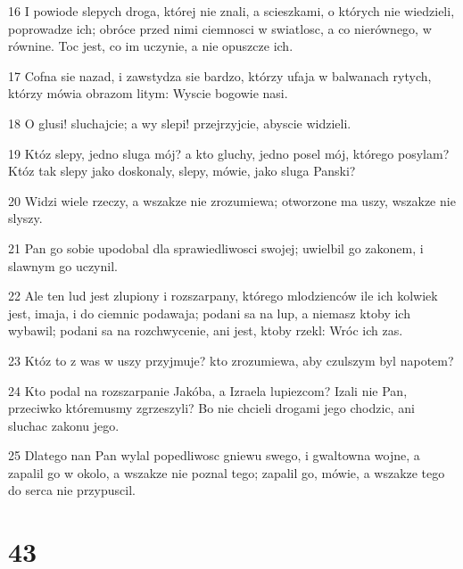 \par 16 I powiode slepych droga, której nie znali, a scieszkami, o których nie wiedzieli, poprowadze ich; obróce przed nimi ciemnosci w swiatlosc, a co nierównego, w równine. Toc jest, co im uczynie, a nie opuszcze ich.
\par 17 Cofna sie nazad, i zawstydza sie bardzo, którzy ufaja w balwanach rytych, którzy mówia obrazom litym: Wyscie bogowie nasi.
\par 18 O glusi! sluchajcie; a wy slepi! przejrzyjcie, abyscie widzieli.
\par 19 Któz slepy, jedno sluga mój? a kto gluchy, jedno posel mój, którego posylam? Któz tak slepy jako doskonaly, slepy, mówie, jako sluga Panski?
\par 20 Widzi wiele rzeczy, a wszakze nie zrozumiewa; otworzone ma uszy, wszakze nie slyszy.
\par 21 Pan go sobie upodobal dla sprawiedliwosci swojej; uwielbil go zakonem, i slawnym go uczynil.
\par 22 Ale ten lud jest zlupiony i rozszarpany, którego mlodzienców ile ich kolwiek jest, imaja, i do ciemnic podawaja; podani sa na lup, a niemasz ktoby ich wybawil; podani sa na rozchwycenie, ani jest, ktoby rzekl: Wróc ich zas.
\par 23 Któz to z was w uszy przyjmuje? kto zrozumiewa, aby czulszym byl napotem?
\par 24 Kto podal na rozszarpanie Jakóba, a Izraela lupiezcom? Izali nie Pan, przeciwko któremusmy zgrzeszyli? Bo nie chcieli drogami jego chodzic, ani sluchac zakonu jego.
\par 25 Dlatego nan Pan wylal popedliwosc gniewu swego, i gwaltowna wojne, a zapalil go w okolo, a wszakze nie poznal tego; zapalil go, mówie, a wszakze tego do serca nie przypuscil.

\chapter{43}


